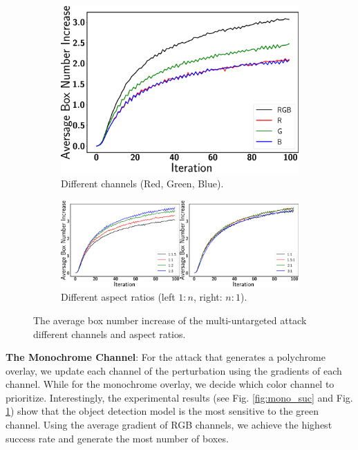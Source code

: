 \begin{figure}[H]
    \centering
    \begin{subfigure}[b]{0.5\textwidth}
        \includegraphics[width=\textwidth]{figures/chapter_detection/detection/multi_untargeted_mono_box.png}
        \caption{Different channels (Red, Green, Blue).}
         \label{fig:mono_box}
    \end{subfigure}
    \begin{subfigure}[b]{0.9\textwidth}
        \includegraphics[width=1\textwidth]{figures/chapter_detection/detection/multi_untargeted_aspect_box.png}
        \caption{Different aspect ratios (left $1:n$, right: $n:1$).}
         \label{fig:aspect_box}
    \end{subfigure}

    \caption{The average box number increase of the multi-untargeted attack different channels and aspect ratios.}
\end{figure}

\textbf{The Monochrome Channel}: For the attack that generates a polychrome overlay, we update each channel of the perturbation using the gradients of each channel. While for the monochrome overlay, we decide which color channel to prioritize. Interestingly, the experimental results (see Fig. \ref{fig:mono_suc} and Fig. \ref{fig:mono_box}) show that the object detection model is the most sensitive to the green channel. Using the average gradient of RGB channels, we achieve the highest success rate and generate the most number of boxes.

